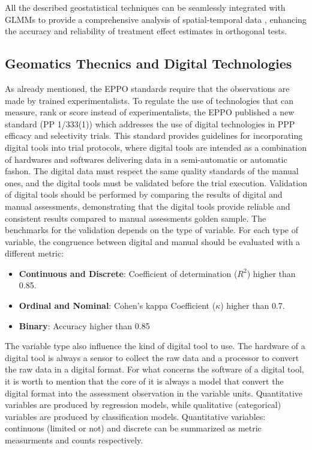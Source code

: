 \documentclass[12pt,a4paper,oneside]{report}
\begin{document}
All the described geostatistical techniques can be seamlessly integrated with GLMMs to
provide a comprehensive analysis of spatial-temporal data
\cite{slaetsLinearMixedModels2021,rodriguez-alvarezCorrectingSpatialHeterogeneity2018}, 
enhancing the accuracy and reliability of treatment effect estimates in orthogonal
tests.

\subsection{Geomatics Thecnics and Digital Technologies}

As already mentioned, the EPPO standards require that the
observations are made by trained experimentalists.
To regulate the use of technologies that can measure, rank or score instead of 
experimentalists, the EPPO published a new standard (PP 1/333(1)\cite{PP1333}) which 
addresses the use of digital technologies in PPP efficacy and selectivity trials.
This standard provides guidelines for incorporating digital
tools into trial protocols, where digital tools are intended as a combination of
hardwares and softwares delivering data 
in a semi-automatic or automatic fashon.
The digital data must respect the same quality standards of the manual
ones, and the digital tools must be validated before the trial execution.
Validation of digital tools should
be performed by comparing the results of digital and manual assessments, 
demonstrating that the digital tools provide reliable and consistent
results compared to manual assessments golden sample. 
The benchmarks for the validation depends
on the type of variable. For each type of variable, the congruence between 
digital and manual should be evaluated with a different metric:

\begin{itemize}
    \item \textbf{Continuous and Discrete}: Coefficient of determination ($R^2$) higher than 0.85.
    \item \textbf{Ordinal and Nominal}: Cohen's kappa Coefficient ($\kappa$) higher than 0.7.
    \item \textbf{Binary}: Accuracy higher than 0.85
\end{itemize}

The variable type also influence the kind of digital tool to use.
The hardware of a digital tool is always a sensor to collect the raw data and a
processor to convert the raw data in a digital format.
For what concerns the software of a digital tool, it is worth to mention that
the core of it is always a model that convert the digital format into the assessment
observation in the variable units.
Quantitative variables are produced by regression models, while qualitative (categorical) 
variables are produced by classification models. 
Quantitative variables: continuous (limited or not) and discrete
can be summarized as metric measurments and counts respectively.
\end{document}
